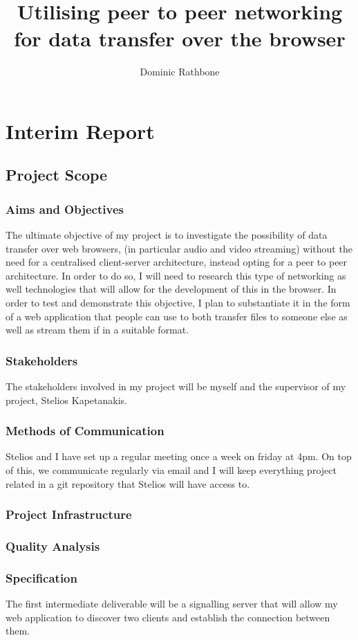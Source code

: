 \documentclass[]{report}
\title{Utilising peer to peer networking for data transfer over the browser}
\author{Dominic Rathbone}
\begin{document}
\maketitle
\tableofcontents


\chapter*{Interim Report}
\section{Project Scope}
\subsection*{Aims and Objectives}
The ultimate objective of my project is to investigate the possibility of data transfer over web browsers, (in particular audio and video streaming) without the need for a centralised client-server architecture, instead opting for a peer to peer architecture. In order to do so, I will need to research this type of networking as well technologies that will allow for the development of this in the browser. In order to test and demonstrate this objective, I plan to  substantiate it in the form of a web application that people can use to both transfer files to someone else as well as stream them if in a suitable format.
\subsection*{Stakeholders}
The stakeholders involved in my project will be myself and the supervisor of my project, Stelios Kapetanakis.
\subsection*{Methods of Communication}
Stelios and I have set up a regular meeting once a week on friday at 4pm. On top of this, we communicate regularly via email and I will keep everything project related in a git repository that Stelios will have access to.
\subsection*{Project Infrastructure}
\subsection*{Quality Analysis}
\subsection*{Specification}
The first intermediate deliverable will be a signalling server that will allow my web application to discover two clients and establish the connection between them.
\end{document}
